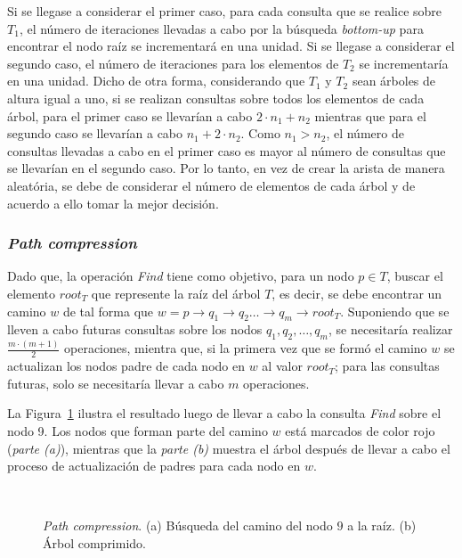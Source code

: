 Si se llegase a considerar el primer caso, para cada consulta que se realice
sobre $T_1$, el número de iteraciones llevadas a cabo por la búsqueda
\textit{bottom-up} para encontrar el nodo raíz se incrementará en una unidad.
Si se llegase a considerar el segundo caso, el número de iteraciones para los
elementos de $T_2$ se incrementaría en una unidad. Dicho de otra forma, 
considerando que $T_1$ y $T_2$ sean árboles de altura igual a uno, si se
realizan consultas sobre todos los elementos de cada árbol, para el primer
caso se llevarían a cabo $2 \cdot n_1 + n_2$ mientras que para el segundo
caso se llevarían a cabo $n_1 + 2 \cdot n_2$. Como $n_1 > n_2$, el número de 
consultas llevadas a cabo en el primer caso es mayor al número de consultas 
que se llevarían en el segundo caso. Por lo tanto, en vez de crear la arista
de manera aleatória, se debe de considerar el número de elementos de cada
árbol y de acuerdo a ello tomar la mejor decisión.

\subsubsection{\textit{Path compression}}
Dado que, la operación \textit{Find} tiene como objetivo, para un nodo
$p \in T$, buscar el elemento $root_T$ que represente la raíz del árbol $T$,
es decir, se debe encontrar un camino $w$ de tal forma que 
$w = p\rightarrow q_1 \rightarrow q_2 \dots \rightarrow q_m \rightarrow root_T$. 
Suponiendo que se lleven a cabo futuras consultas sobre los nodos
$q_1, q_2, \dots, q_m$, se necesitaría realizar $\frac{m \cdot (m + 1)}{2}$ 
operaciones, mientra que, si la primera vez que se formó el camino $w$ se 
actualizan los nodos padre de cada nodo en $w$ al valor $root_T$; para las 
consultas futuras, solo se necesitaría llevar a cabo $m$ operaciones.

La Figura~\ref{fig:cap-segmentacion:UF_path} ilustra el resultado luego de 
llevar a cabo la consulta \textit{Find} sobre el nodo 9. Los nodos que forman 
parte del camino $w$ está marcados de color rojo (\textit{parte (a)}), 
mientras que la \textit{parte (b)} muestra el árbol después de llevar a cabo 
el proceso de actualización de padres para cada nodo en $w$.

\begin{figure}[h!]
  \centering
	 { \, \, \, \, }
   \\ 
	\caption[\textit{Path compression}]{\textit{Path compression}. (a) Búsqueda 
	del camino del nodo $9$ a la raíz. (b) Árbol comprimido.}
	\label{fig:cap-segmentacion:UF_path}
\end{figure}

